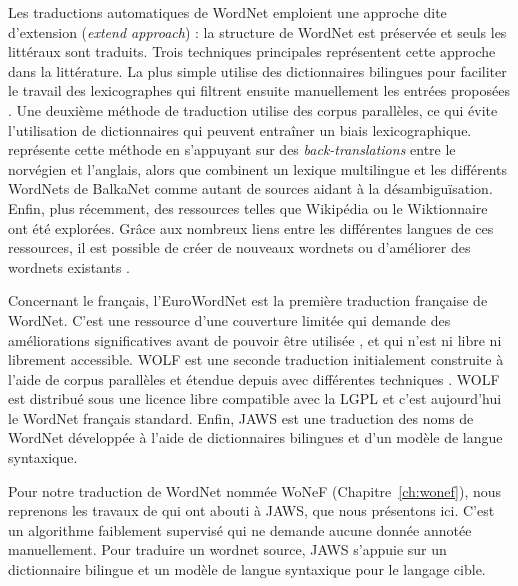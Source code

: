 Les traductions automatiques de WordNet emploient une approche dite d'extension
(\textit{extend approach}) : la structure de WordNet est préservée et seuls les
littéraux sont traduits. Trois techniques principales représentent cette
approche dans la littérature. La plus simple utilise des dictionnaires
bilingues pour faciliter le travail des lexicographes qui filtrent ensuite
manuellement les entrées proposées
\citep{vossen1998eurowordnet,pianta2002developing,tufis2004balkanet}. Une
deuxième méthode de traduction utilise des corpus parallèles, ce qui évite
l'utilisation de dictionnaires qui peuvent entraîner un biais lexicographique.
\cite{dyvik2004translations} représente cette méthode en s'appuyant sur des
\textit{back-translations} entre le norvégien et l'anglais, alors que
\citep{sagot2008construction} combinent un lexique multilingue et les
différents WordNets de BalkaNet comme autant de sources aidant à la
désambiguïsation. Enfin, plus récemment, des ressources telles que Wikipédia ou
le Wiktionnaire ont été explorées. Grâce aux nombreux liens entre les
différentes langues de ces ressources, il est possible de créer de nouveaux
wordnets \citep{demelo2009towards,navigli2010babelnet} ou d'améliorer des
wordnets existants \citep{hanoka2012wordnet}.

Concernant le français, l'EuroWordNet \citep{vossen1998eurowordnet} est la
première traduction française de WordNet. C'est une ressource d'une couverture
limitée qui demande des améliorations significatives avant de pouvoir être
utilisée \citep{jacquin2006systemes}, et qui n'est ni libre ni librement
accessible. WOLF est une seconde traduction initialement construite à l'aide de
corpus parallèles \citep{sagot2008construction} et étendue depuis avec
différentes techniques \citep{apidianaki2012applying}. WOLF est distribué sous
une licence libre compatible avec la LGPL et c'est aujourd'hui le WordNet
français standard. Enfin, JAWS \citep{mouton2010jaws} est une traduction des
noms de WordNet développée à l'aide de dictionnaires bilingues et d'un modèle
de langue syntaxique.

\label{subsec:translation_process}

Pour notre traduction de WordNet nommée WoNeF (Chapitre~\ref{ch:wonef}), nous
reprenons les travaux de \cite{mouton2010jaws} qui ont abouti à JAWS, que nous
présentons ici. C'est un algorithme faiblement supervisé qui ne demande aucune
donnée annotée manuellement. Pour traduire un wordnet source, JAWS s'appuie sur
un dictionnaire bilingue et un modèle de langue syntaxique pour le langage
cible.

